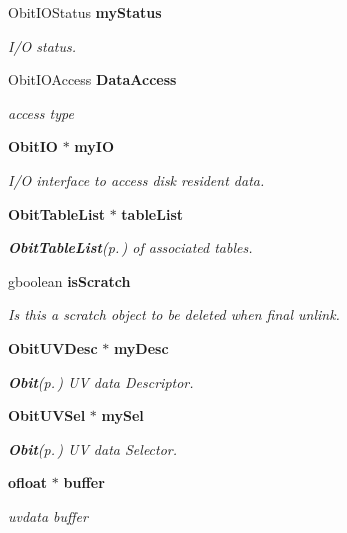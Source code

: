 \begin{CompactItemize}
Obit\-IOStatus {\bf my\-Status}
\begin{CompactList}\small\item\em I/O status. \item\end{CompactList}\item 
Obit\-IOAccess {\bf Data\-Access}
\begin{CompactList}\small\item\em access type \item\end{CompactList}\item 
{\bf Obit\-IO} $\ast$ {\bf my\-IO}
\begin{CompactList}\small\item\em I/O interface to access disk resident data. \item\end{CompactList}\item 
{\bf Obit\-Table\-List} $\ast$ {\bf table\-List}
\begin{CompactList}\small\item\em {\bf Obit\-Table\-List}{\rm (p.\,\pageref{structObitTableList})} of associated tables. \item\end{CompactList}\item 
gboolean {\bf is\-Scratch}
\begin{CompactList}\small\item\em Is this a scratch object to be deleted when final unlink. \item\end{CompactList}\item 
{\bf Obit\-UVDesc} $\ast$ {\bf my\-Desc}
\begin{CompactList}\small\item\em {\bf Obit}{\rm (p.\,\pageref{structObit})} UV data Descriptor. \item\end{CompactList}\item 
{\bf Obit\-UVSel} $\ast$ {\bf my\-Sel}
\begin{CompactList}\small\item\em {\bf Obit}{\rm (p.\,\pageref{structObit})} UV data Selector. \item\end{CompactList}\item 
{\bf ofloat} $\ast$ {\bf buffer}
\begin{CompactList}\small\item\em uvdata buffer \item\end{CompactList}\item 

\end{CompactItemize}
